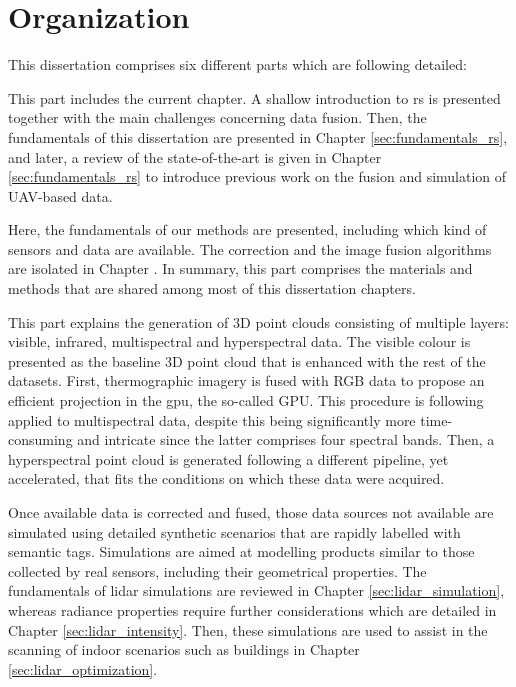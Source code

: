 \section{Organization}

This dissertation comprises six different parts which are following detailed:

\newcommand{\partTabSize}{3mm}

\small \noindent \textbf{} \normalsize\hspace{\partTabSize} This part includes the current chapter. A shallow introduction to \acrshort{rs} is presented together with the main challenges concerning data fusion. Then, the fundamentals of this dissertation are presented in Chapter \ref{sec:fundamentals_rs}, and later, a review of the state-of-the-art is given in Chapter \ref{sec:fundamentals_rs} to introduce previous work on the fusion and simulation of UAV-based data.

\small \noindent \textbf{} \normalsize\hspace{\partTabSize} Here, the fundamentals of our methods are presented, including which kind of sensors and data are available. The correction and the image fusion algorithms are isolated in Chapter . In summary, this part comprises the materials and methods that are shared among most of this dissertation chapters.

\small \noindent \textbf{} \normalsize\hspace{\partTabSize} This part explains the generation of 3D point clouds consisting of multiple layers: visible, infrared, multispectral and hyperspectral data. The visible colour is presented as the baseline 3D point cloud that is enhanced with the rest of the datasets. First, thermographic imagery is fused with RGB data to propose an efficient projection in the \acrshort{gpu}, the so-called GPU. This procedure is following applied to multispectral data, despite this being significantly more time-consuming and intricate since the latter comprises four spectral bands. Then, a hyperspectral point cloud is generated following a different pipeline, yet accelerated, that fits the conditions on which these data were acquired.  

\small \noindent \textbf{} \normalsize\hspace{\partTabSize} Once available data is corrected and fused, those data sources not available are simulated using detailed synthetic scenarios that are rapidly labelled with semantic tags. Simulations are aimed at modelling products similar to those collected by real sensors, including their geometrical properties. The fundamentals of \acrshort{lidar} simulations are reviewed in Chapter \ref{sec:lidar_simulation}, whereas radiance properties require further considerations which are detailed in Chapter \ref{sec:lidar_intensity}. Then, these simulations are used to assist in the scanning of indoor scenarios such as buildings in Chapter \ref{sec:lidar_optimization}.

